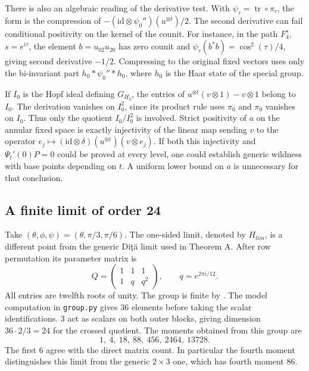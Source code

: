 \documentclass[11pt,a4paper]{amsart}
\newcommand{\tr}{\operatorname{tr}}
\begin{document}
There is also an algebraic reading of the derivative test. With $\psi_\tau=\tr\circ\pi_\tau$, the form is the compression of $-(\mathrm{id}\otimes\psi_0'')(u^{\otimes t})/2$. The second derivative can fail conditional positivity on the kernel of the counit. For instance, in the path $F_4^s$, $s=e^{i\tau}$, the element $b=u_{02}u_{20}$ has zero counit and $\psi_\tau(b^*b)=\cos^2(\tau)/4$, giving second derivative $-1/2$. Compressing to the original fixed vectors uses only the bi-invariant part $h_0*\psi_0''*h_0$, where $h_0$ is the Haar state of the special group.

If $I_0$ is the Hopf ideal defining $G_{H_0}$, the entries of $u^{\otimes t}(v\otimes1)-v\otimes1$ belong to $I_0$. The derivation vanishes on $I_0^2$, since its product rule uses $\pi_0$ and $\pi_0$ vanishes on $I_0$. Thus only the quotient $I_0/I_0^2$ is involved. Strict positivity of $a$ on the annular fixed space is exactly injectivity of the linear map sending $v$ to the operator $e_j\mapsto(\mathrm{id}\otimes\delta)(u^{\otimes t})(v\otimes e_j)$. If both this injectivity and $\Psi_t'(0)P=0$ could be proved at every level, one could establish generic wildness with base points depending on $t$. A uniform lower bound on $a$ is unnecessary for that conclusion.

\subsection{A finite limit of order 24}
Take $(\theta,\phi,\psi)=(\theta,\pi/3,\pi/6)$. The one-sided limit, denoted by $H_{lim}$, is a different point from the generic Di\c t\u a limit used in Theorem A. After row permutation its parameter matrix is
\[
 Q=\begin{pmatrix}1&1&1\\1&q&q^2\end{pmatrix},\qquad q=e^{2\pi i/12}.
\]
All entries are twelfth roots of unity. The group is finite by \cite[Theorem 4.4]{bo}. The model computation in \texttt{group.py} gives 36 elements before taking the scalar identifications. 3 act as scalars on both outer blocks, giving dimension $36\cdot2/3=24$ for the crossed quotient. The moments obtained from this group are
\[
 1,\ 4,\ 18,\ 88,\ 456,\ 2464,\ 13728 .
\]
The first 6 agree with the direct matrix count. In particular the fourth moment distinguishes this limit from the generic $2\times3$ one, which has fourth moment 86.
\end{document}
